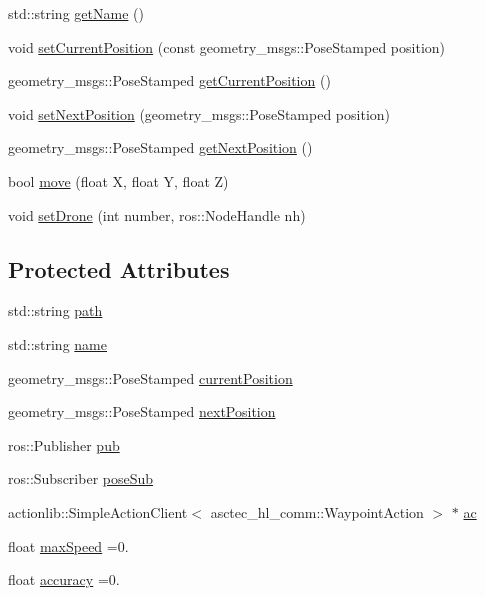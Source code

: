 \begin{DoxyCompactItemize}
\item 
std\+::string \hyperlink{classDrone_a1fcaf0892001bf12b99c838e64878d9e}{get\+Name} ()
\item 
void \hyperlink{classDrone_a16ee9c16220886633f98e591c9e3dac5}{set\+Current\+Position} (const geometry\+\_\+msgs\+::\+Pose\+Stamped position)
\item 
geometry\+\_\+msgs\+::\+Pose\+Stamped \hyperlink{classDrone_a0113e8f3a3f438113dca0d77c065276b}{get\+Current\+Position} ()
\item 
void \hyperlink{classDrone_a9addfdac3dc0e676ba12c1f4ced68fbe}{set\+Next\+Position} (geometry\+\_\+msgs\+::\+Pose\+Stamped position)
\item 
geometry\+\_\+msgs\+::\+Pose\+Stamped \hyperlink{classDrone_a6a6df41b8eae2b1d6c2b66f046fe5a24}{get\+Next\+Position} ()
\item 
bool \hyperlink{classDrone_a106284f63c05f3f112435b2cb5c4896c}{move} (float X, float Y, float Z)
\item 
void \hyperlink{classDrone_a2ce35a5df79f379f6f8d3586d444c3f4}{set\+Drone} (int number, ros\+::\+Node\+Handle nh)
\end{DoxyCompactItemize}
\subsection*{Protected Attributes}
\begin{DoxyCompactItemize}
\item 
std\+::string \hyperlink{classDrone_a19bf0a73d086997ba0589984c58b62da}{path}
\item 
std\+::string \hyperlink{classDrone_ac5f6c269378659247acd057142542013}{name}
\item 
geometry\+\_\+msgs\+::\+Pose\+Stamped \hyperlink{classDrone_a190e4f63bb9a0e5b4f822fc87f2185f9}{current\+Position}
\item 
geometry\+\_\+msgs\+::\+Pose\+Stamped \hyperlink{classDrone_a49f95c0480f27c22c122f5bb8482e914}{next\+Position}
\item 
ros\+::\+Publisher \hyperlink{classDrone_a4bdfc664da2ebff40d9a4b413e4ea768}{pub}
\item 
ros\+::\+Subscriber \hyperlink{classDrone_a8baae58c4cbe6f1a8d239fca2d3496d6}{pose\+Sub}
\item 
actionlib\+::\+Simple\+Action\+Client$<$ asctec\+\_\+hl\+\_\+comm\+::\+Waypoint\+Action $>$ $\ast$ \hyperlink{classDrone_a767d339ed35d7be9c8ea4709a8dccb47}{ac}
\item 
float \hyperlink{classDrone_a915ef72b30c96172ff8f295cbb7f47d4}{max\+Speed} =0.
\item 
float \hyperlink{classDrone_afbbc1d4b668c6d5021344f0578c12973}{accuracy} =0.
\end{DoxyCompactItemize}


